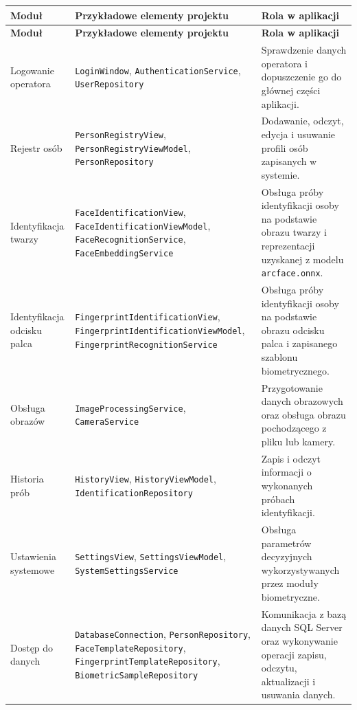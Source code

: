 \renewcommand{\arraystretch}{1.15}
\begin{xltabular}{\textwidth}{|
    >{\RaggedRight\arraybackslash}p{2.1cm}|
    >{\RaggedRight\arraybackslash}p{7.3cm}|
    >{\RaggedRight\arraybackslash}X|}

    \hline
    \textbf{Moduł} & \textbf{Przykładowe elementy projektu} & \textbf{Rola w aplikacji} \\
    \hline
    \endfirsthead

    \hline
    \textbf{Moduł} & \textbf{Przykładowe elementy projektu} & \textbf{Rola w aplikacji} \\
    \hline
    \endhead

    Logowanie operatora & \texttt{LoginWindow}, \texttt{AuthenticationService}, \texttt{UserRepository} & Sprawdzenie danych operatora i dopuszczenie go do głównej części aplikacji. \\
    \hline
    Rejestr osób & \texttt{PersonRegistryView}, \texttt{PersonRegistryViewModel}, \texttt{PersonRepository} & Dodawanie, odczyt, edycja i usuwanie profili osób zapisanych w systemie. \\
    \hline
    Identyfikacja twarzy & \texttt{FaceIdentificationView}, \texttt{FaceIdentificationViewModel}, \texttt{FaceRecognitionService}, \texttt{FaceEmbeddingService} & Obsługa próby identyfikacji osoby na podstawie obrazu twarzy i reprezentacji uzyskanej z modelu \texttt{arcface.onnx}. \\
    \hline
    Identyfikacja odcisku palca & \texttt{FingerprintIdentificationView}, \texttt{FingerprintIdentificationViewModel}, \texttt{FingerprintRecognitionService} & Obsługa próby identyfikacji osoby na podstawie obrazu odcisku palca i zapisanego szablonu biometrycznego. \\
    \hline
    Obsługa \newline obrazów & \texttt{ImageProcessingService}, \texttt{CameraService} & Przygotowanie danych obrazowych oraz obsługa obrazu pochodzącego z pliku lub kamery. \\
    \hline
    Historia prób & \texttt{HistoryView}, \texttt{HistoryViewModel}, \texttt{IdentificationRepository} & Zapis i odczyt informacji o wykonanych próbach identyfikacji. \\
    \hline
    Ustawienia systemowe & \texttt{SettingsView}, \texttt{SettingsViewModel}, \texttt{SystemSettingsService} & Obsługa parametrów decyzyjnych wykorzystywanych przez moduły biometryczne. \\
    \hline
    Dostęp do danych & \texttt{DatabaseConnection}, \texttt{PersonRepository}, \texttt{FaceTemplateRepository}, \texttt{FingerprintTemplateRepository}, \texttt{BiometricSampleRepository} & Komunikacja z bazą danych SQL Server oraz wykonywanie operacji zapisu, odczytu, aktualizacji i usuwania danych. \\

\end{xltabular}
